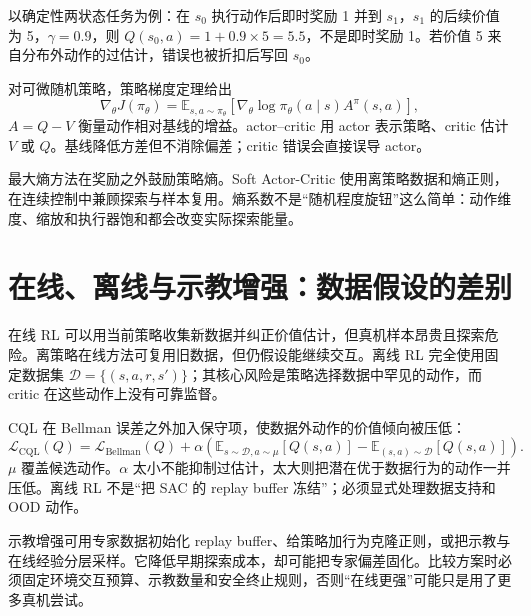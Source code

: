 以确定性两状态任务为例：在 $s_0$ 执行动作后即时奖励 1 并到 $s_1$，$s_1$ 的后续价值为 5，$\gamma=0.9$，则 $Q(s_0,a)=1+0.9\times5=5.5$，不是即时奖励 1。若价值 5 来自分布外动作的过估计，错误也被折扣后写回 $s_0$。

对可微随机策略，策略梯度定理给出
\begin{equation}
\nabla_\theta J(\pi_\theta)
=\mathbb E_{s,a\sim\pi_\theta}
\left[\nabla_\theta\log\pi_\theta(a\mid s)A^\pi(s,a)\right],
\label{eq:policy-gradient}
\end{equation}
$A=Q-V$ 衡量动作相对基线的增益。actor--critic 用 actor 表示策略、critic 估计 $V$ 或 $Q$。基线降低方差但不消除偏差；critic 错误会直接误导 actor。

最大熵方法在奖励之外鼓励策略熵。Soft Actor-Critic 使用离策略数据和熵正则，在连续控制中兼顾探索与样本复用\cite{haarnoja2018sac}。熵系数不是“随机程度旋钮”这么简单：动作维度、缩放和执行器饱和都会改变实际探索能量。

\section{在线、离线与示教增强：数据假设的差别}

在线 RL 可以用当前策略收集新数据并纠正价值估计，但真机样本昂贵且探索危险。离策略在线方法可复用旧数据，但仍假设能继续交互。离线 RL 完全使用固定数据集 $\mathcal D=\{(s,a,r,s')\}$；其核心风险是策略选择数据中罕见的动作，而 critic 在这些动作上没有可靠监督。

CQL 在 Bellman 误差之外加入保守项，使数据外动作的价值倾向被压低\cite{kumar2020cql}：
\begin{equation}
\mathcal L_{\mathrm{CQL}}(Q)=\mathcal L_{\mathrm{Bellman}}(Q)
+\alpha\left(\mathbb E_{s\sim\mathcal D,a\sim\mu}[Q(s,a)]
-\mathbb E_{(s,a)\sim\mathcal D}[Q(s,a)]\right).
\label{eq:cql-objective}
\end{equation}
$\mu$ 覆盖候选动作。$\alpha$ 太小不能抑制过估计，太大则把潜在优于数据行为的动作一并压低。离线 RL 不是“把 SAC 的 replay buffer 冻结”；必须显式处理数据支持和 OOD 动作。

示教增强可用专家数据初始化 replay buffer、给策略加行为克隆正则，或把示教与在线经验分层采样。它降低早期探索成本，却可能把专家偏差固化。比较方案时必须固定环境交互预算、示教数量和安全终止规则，否则“在线更强”可能只是用了更多真机尝试。

